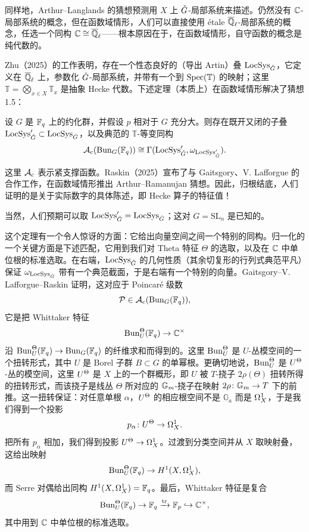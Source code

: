 同样地，Arthur–Langlands 的猜想预测用 $X$ 上 $\check{G}$-局部系统来描述。仍然没有 $\mathbb{C}$-局部系统的概念，但在函数域情形，人们可以直接使用 étale $\overline{\mathbb{Q}}_\ell$-局部系统的概念，任选一个同构 $\mathbb{C}\cong\overline{\mathbb{Q}}_\ell$——根本原因在于，在函数域情形，自守函数的概念是纯代数的。

Zhu（2025）的工作表明，存在一个性态良好的（导出 Artin）叠 $\operatorname{LocSys}_{\check{G}}$，它定义在 $\overline{\mathbb{Q}}_\ell$ 上，参数化 $\check{G}$-局部系统，并带有一个到 $\operatorname{Spec}(\mathbb{T})$ 的映射；这里 $\mathbb{T}=\bigotimes_{x\in X}\mathbb{T}_x$ 是抽象 Hecke 代数。下述定理（本质上）在函数域情形解决了猜想 1.5：

\begin{theorem}
设 $G$ 是 $\mathbb{F}_{q}$ 上的约化群，并假设 $p$ 相对于 $G$ 充分大。则存在既开又闭的子叠 $\operatorname{LocSys}'_{\check{G}}\subset\operatorname{LocSys}_{\check{G}}$，以及典范的 $\mathbb{T}$-等变同构
\[ \mathcal{A}_c(\operatorname{Bun}_G(\mathbb{F}_{q}))\cong\Gamma(\operatorname{LocSys}'_{\check{G}},\omega_{\operatorname{LocSys}'_{\check{G}}}). \]
\end{theorem}

这里 $\mathcal{A}_c$ 表示紧支撑函数。Raskin（2025）宣布了与 Gaitsgory、V. Lafforgue 的合作工作，在函数域情形推出 Arthur–Ramanujan 猜想。因此，归根结底，人们证明的是关于实际数字的具体陈述，即 Hecke 算子的特征值！

当然，人们预期可以取 $\operatorname{LocSys}'_{\check{G}}=\operatorname{LocSys}_{\check{G}}$；这对 $G=\mathrm{SL}_n$ 是已知的。

\begin{remark}
这个定理有一个令人惊讶的方面：它给出向量空间之间一个特别的同构。归一化的一个关键方面是下述匹配，它用到我们对 Theta 特征 $\Theta$ 的选取，以及在 $\mathbb{C}$ 中单位根的标准选取。在右端，$\operatorname{LocSys}_{\check{G}}$ 的几何性质（其余切复形的行列式典范平凡）保证 $\omega_{\operatorname{LocSys}_{\check{G}}}$ 带有一个典范截面，于是右端有一个特别的向量。Gaitsgory–V. Lafforgue–Raskin 证明，这对应于 Poincaré 级数
\[ \mathcal{P}\in\mathcal{A}_c(\operatorname{Bun}_G(\mathbb{F}_{q})), \]
它是把 Whittaker 特征
\[ \operatorname{Bun}_U^{\Theta}(\mathbb{F}_{q})\to\mathbb{C}^\times \]
沿 $\operatorname{Bun}_U^{\Theta}(\mathbb{F}_{q})\to\operatorname{Bun}_G(\mathbb{F}_{q})$ 的纤维求和而得到的。这里 $\operatorname{Bun}_U^{\Theta}$ 是 $U$-丛模空间的一个扭转形式，其中 $U$ 是 Borel 子群 $B\subset G$ 的单幂根。更确切地说，$\operatorname{Bun}_U^{\Theta}$ 是 $U^{\Theta}$-丛的模空间，这里 $U^{\Theta}$ 是 $X$ 上的一个群概形，即 $U$ 被 $T$-挠子 $2\rho(\Theta)$ 扭转所得的扭转形式，而该挠子是线丛 $\Theta$ 所对应的 $\mathbb{G}_m$-挠子在映射 $2\rho\colon\mathbb{G}_m\to T$ 下的前推。这一扭转保证：对任意单根 $\alpha$，$U^{\Theta}$ 的相应根空间不是 $\mathbb{G}_a$ 而是 $\Omega^{1}_{X}$，于是我们得到一个投影
\[ p_\alpha\colon U^{\Theta}\to\Omega^{1}_{X}. \]
把所有 $p_\alpha$ 相加，我们得到投影 $U^{\Theta}\to\Omega^{1}_{X}$。过渡到分类空间并从 $X$ 取映射叠，这给出映射
\[ \operatorname{Bun}_U^{\Theta}(\mathbb{F}_{q})\to H^1(X,\Omega^{1}_{X}), \]
而 Serre 对偶给出同构 $H^1(X,\Omega^{1}_{X})=\mathbb{F}_{q}$。最后，Whittaker 特征是复合
\[ \operatorname{Bun}_U^{\Theta}(\mathbb{F}_{q})\to\mathbb{F}_{q}\xrightarrow{\operatorname{tr}}\mathbb{F}_{p}\hookrightarrow\mathbb{C}^\times, \]
其中用到 $\mathbb{C}$ 中单位根的标准选取。
\end{remark}

